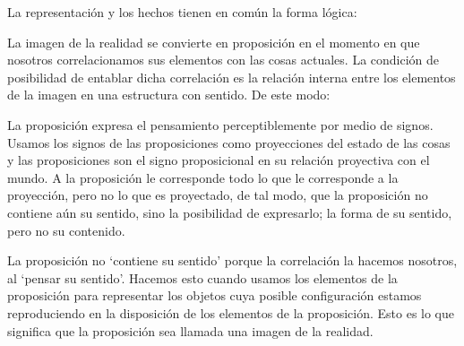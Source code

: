 La representación y los hechos tienen en común la forma lógica:

    La imagen de la realidad se convierte en proposición en el momento en que
    nosotros correlacionamos sus elementos con las cosas
    actuales.\autocite[cf.~][p.~73]{IWT}
    La condición de posibilidad de entablar dicha correlación es la relación interna
    entre los elementos de la imagen en una estructura con
    sentido.\autocite[cf.~][p.~68]{IWT}
    De este modo:

    La proposición expresa el pensamiento perceptiblemente por medio de signos.
    Usamos los signos de las proposiciones como proyecciones del estado de las cosas
    y las proposiciones son el signo proposicional en su relación proyectiva con el
    mundo. A la proposición le corresponde todo lo que le corresponde a la
    proyección, pero no lo que es proyectado, de tal modo, que la proposición no
    contiene aún su sentido, sino la posibilidad de expresarlo; la forma de su
    sentido, pero no su contenido.\autocite[cf.~][3.1,3.11-3.13]{tractatus} 

    La proposición no `contiene su sentido' porque la correlación la hacemos nosotros,
    al `pensar su sentido'. Hacemos esto cuando usamos los elementos de la
    proposición para representar los objetos cuya posible configuración estamos 
    reproduciendo en la disposición de los elementos de la proposición. Esto es lo
    que significa que la proposición sea llamada una imagen de la
    realidad.\autocite[cf.~][p.69]{IWT}  

